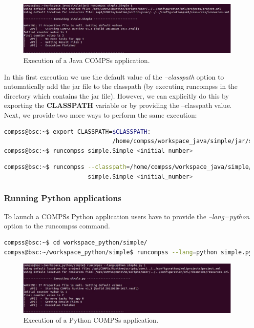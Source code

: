 \begin{figure}[h!]
  \centering
    \includegraphics[width=\textwidth]{./Sections/2_Execution/Figures/java_execution.jpeg}
    \caption{Execution of a Java COMPSs application.}
    \label{fig:java_execution}
\end{figure}
\vspace{-0.4cm}

In this first execution we use the default value of the \textit{--classpath} option to automatically add the jar
file to the classpath (by executing runcompss in the directory which contains the jar file). However,
we can explicitly do this by exporting the \textbf{CLASSPATH} variable or by providing the 
--classpath value. Next, we provide two more ways to perform the same execution:

\begin{lstlisting}[language=bash]
compss@bsc:~$ export CLASSPATH=$CLASSPATH:
                               /home/compss/workspace_java/simple/jar/simple.jar
compss@bsc:~$ runcompss simple.Simple <initial_number>
\end{lstlisting}

\begin{lstlisting}[language=bash]
compss@bsc:~$ runcompss --classpath=/home/compss/workspace_java/simple/jar/simple.jar 
                        simple.Simple <initial_number>
\end{lstlisting}


\subsubsection{Running Python applications}
To launch a COMPSs Python application users have to provide the \textit{--lang=python} option to the runcompss command. 

\begin{lstlisting}[language=bash]
compss@bsc:~$ cd workspace_python/simple/
compss@bsc:~/workspace_python/simple$ runcompss --lang=python simple.py <initial_number>
\end{lstlisting}

\begin{figure}[h!]
  \centering
    \includegraphics[width=\textwidth]{./Sections/2_Execution/Figures/python_execution.jpeg}
    \caption{Execution of a Python COMPSs application.}
    \label{fig:python_execution}
\end{figure}
\vspace{-0.4cm}


